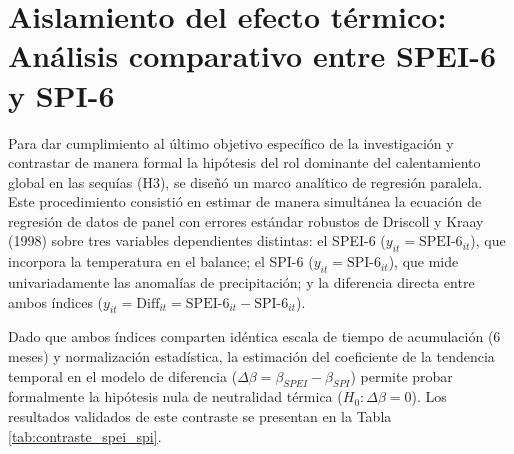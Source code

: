 \section{Aislamiento del efecto térmico: Análisis comparativo entre SPEI-6 y SPI-6}

Para dar cumplimiento al último objetivo específico de la investigación y contrastar de manera formal la hipótesis del rol dominante del calentamiento global en las sequías (H3), se diseñó un marco analítico de regresión paralela. Este procedimiento consistió en estimar de manera simultánea la ecuación de regresión de datos de panel con errores estándar robustos de Driscoll y Kraay (1998) sobre tres variables dependientes distintas: el SPEI-6 ($y_{it} = \text{SPEI-6}_{it}$), que incorpora la temperatura en el balance; el SPI-6 ($y_{it} = \text{SPI-6}_{it}$), que mide univariadamente las anomalías de precipitación; y la diferencia directa entre ambos índices ($y_{it} = \text{Diff}_{it} = \text{SPEI-6}_{it} - \text{SPI-6}_{it}$). 

Dado que ambos índices comparten idéntica escala de tiempo de acumulación (6 meses) y normalización estadística, la estimación del coeficiente de la tendencia temporal en el modelo de diferencia ($\Delta \beta = \beta_{SPEI} - \beta_{SPI}$) permite probar formalmente la hipótesis nula de neutralidad térmica ($H_0: \Delta \beta = 0$). Los resultados validados de este contraste se presentan en la Tabla \ref{tab:contraste_spei_spi}.

